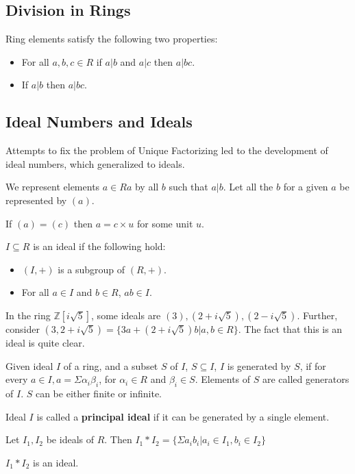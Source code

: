 \subsection{Division in Rings}
Ring elements satisfy the following two properties:
\begin{itemize}
  \item For all $a, b, c \in R$ if $a | b$ and $a | c$ then $a | bc$.
  \item If $a | b$ then $a | bc$.
\end{itemize}
\subsection{Ideal Numbers and Ideals}
Attempts to fix the problem of Unique Factorizing led to the development of ideal numbers, which generalized to ideals.
\par
We represent elements $a \in Ra$ by all $b$ such that $a | b$.
Let all the $b$ for a given $a$ be represented by $(a)$.
\begin{lemma} \label{lem: idealnumbers}
  If $(a) = (c)$ then $a = c \times u$ for some unit $u$.
\end{lemma}
\begin{definition}\label{def:ideals}
  $I \subseteq R$ is an ideal if the following hold:
  \begin{itemize}
    \item $(I, +)$ is a subgroup of $(R, +)$.
    \item For all $a \in I$ and $b \in R$,  $ab \in I$.
  \end{itemize}
\end{definition}
In the ring $\mathbb{Z}[ i \sqrt{5}]$, some ideals are $(3), (2 + i \sqrt{5}), (2 - i \sqrt{5})$.
Further, consider $(3, 2 + i \sqrt{5}) = \{ 3a + (2 + i \sqrt{5}) b | a, b \in R \}$.
The fact that this is an ideal is quite clear.
\par
Given ideal $I$ of a ring, and a subset $S$ of $I$, $S \subseteq I$, $I$ is generated by $S$, if for every $a \in I, a = \Sigma \alpha_{i} \beta_{i}$, for $\alpha_{i} \in R$ and $\beta_{i} \in S$.
Elements of $S$ are called generators of $I$.
$S$ can be either finite or infinite.
\par
Ideal $I$ is called a \textbf{principal ideal} if it can be generated by a single element.
\par
Let $I_{1}, I_{2}$ be ideals of $R$.
Then $I_{1} * I_{2} = \{ \Sigma a_{i} b_{i} | a_{i} \in I_{1}, b_{i} \in I_{2} \}$
\begin{lemma} \label{lem:idealproduct}
  $I_{1} * I_{2}$ is an ideal.
\end{lemma}
